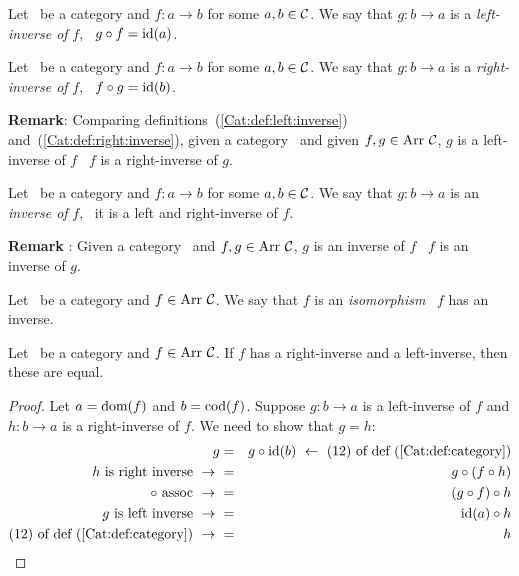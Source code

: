 \begin{defin}\label{Cat:def:left:inverse}
    Let \Cat\ be a category and $f:a\to b$ for some $a,b\in\mbox{$\cal C$}$. 
    We say that $g:b \to a$ is a {\em left-inverse of} $f$, \ifand\ 
    $g\circ f=\mbox{\rm id}(a)$.
\end{defin}

\begin{defin}\label{Cat:def:right:inverse}
    Let \Cat\ be a category and $f:a\to b$ for some $a,b\in\mbox{$\cal C$}$. 
    We say that $g:b \to a$ is a {\em right-inverse of} $f$, \ifand\ 
    $f\circ g=\mbox{\rm id}(b)$.
\end{defin}

\noindent
{\bf Remark}: Comparing definitions~(\ref{Cat:def:left:inverse})
and~(\ref{Cat:def:right:inverse}), given a category \Cat\ and given 
$f,g\in\arr\ \Cat$, $g$ is a left-inverse of $f$ \ifand\ $f$ is a 
right-inverse of $g$.

\begin{defin}\label{Cat:def:inverse}
    Let \Cat\ be a category and $f:a\to b$ for some $a,b\in\mbox{$\cal C$}$. 
    We say that $g:b \to a$ is an {\em inverse of} $f$, \ifand\ 
    it is a left and right-inverse of $f$.
\end{defin}

\noindent 
{\bf Remark} : Given a category \Cat\ and $f,g\in\arr\ \Cat$, $g$ is
an inverse of $f$ \ifand\ $f$ is an inverse of $g$.

\begin{defin}\label{Cat:def:isomorphism}
    Let \Cat\ be a category and $f\in\arr\ \Cat$. We say that $f$ is
    an {\em isomorphism} \ifand\ $f$ has an inverse.
\end{defin}

\begin{prop}\label{Cat:prop:inverse:left:right:inverse:equal}
    Let \Cat\ be a category and $f\in\arr\ \Cat$. If $f$
    has a right-inverse and a left-inverse, then these are equal.
\end{prop}
\begin{proof}
    Let $a=\mbox{\rm dom}(f)$ and $b=\mbox{\rm cod}(f)$. Suppose $g:b\to a$ is a left-inverse of 
    $f$ and $h:b \to a$ is a right-inverse of $f$. We need to show that $g=h$:
    \begin{eqnarray*}g
        &=&g\circ\id(b)\ \leftarrow\ 
        \mbox{$(12)$ of def~(\ref{Cat:def:category})}\\
        \mbox{$h$ is right inverse}\ \to\ 
        &=&g\circ(f\circ h)\\
        \mbox{$\circ$ assoc}\ \to\ 
        &=&(g\circ f)\circ h\\
        \mbox{$g$ is left inverse}\ \to\ 
        &=&\id(a)\circ h\\
        \mbox{$(12)$ of def~(\ref{Cat:def:category})}\ \to\ 
        &=&h
    \end{eqnarray*}
\end{proof}

